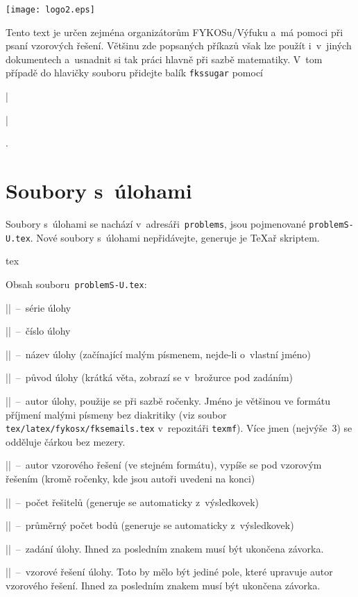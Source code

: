 \documentclass[fykos]{fksbase}
\newenvironment{texsource}
	{\VerbatimEnvironment\begin{mdframed}[backgroundcolor=mintedbg]%
		\hskip-16pt\begin{texminted}{tex}}
	{\end{texminted}\hskip-40pt\end{mdframed}}
\begin{document}
\begin{center}
	\texttt{[image: logo2.eps]}
	\hspace{10pt}
	\vskip0.6cm
\end{center}

Tento text je určen zejména organizátorům FYKOSu/Výfuku a~má pomoci při psaní
vzorových řešení. Většinu zde popsaných příkazů však lze použít i~v~jiných
dokumentech a~usnadnit si tak práci hlavně při sazbě matematiky. V~tom případě
do hlavičky souboru přidejte balík \texttt{fkssugar}
pomocí~{\texinline|\usepackage{fkssugar}|}.

\section{Soubory s~úlohami}

Soubory s~úlohami se nachází v~adresáři~\texttt{problems}, jsou pojmenované
\texttt{problemS-U.tex}. Nové soubory s~úlohami nepřidávejte, generuje je TeXař
skriptem.

\begin{texsource}
\probsolution{%
}
\end{texsource}

Obsah souboru~\texttt{problemS-U.tex}:
\begin{compactitem}
	\item \texinline|\probbatch|~--~série úlohy
	\item \texinline|\probno|~--~číslo úlohy
	\item \texinline|\probname|~--~název úlohy (začínající malým písmenem, nejde-li
		o~vlastní jméno)
	\item \texinline|\proborigin|~--~původ úlohy (krátká věta, zobrazí se v~brožurce pod
		zadáním)
	\item \texinline|\probauthors|~--~autor úlohy, použije se při sazbě ročenky. Jméno
	je většinou ve formátu příjmení malými písmeny bez diakritiky (viz soubor
	\texttt{tex/latex/fykosx/fksemails.tex} v~repozitáři \texttt{texmf}). Více jmen
	(nejvýše~3) se odděluje čárkou bez mezery.
	\item \texinline|\probsolauthors|~--~autor vzorového řešení (ve stejném formátu),
		vypíše se pod vzorovým řešením (kromě ročenky, kde jsou autoři uvedeni na konci)
	\item \texinline|\probsolvers|~--~počet řešitelů (generuje se automaticky
		z~výsledkovek)
	\item \texinline|\probavg|~--~průměrný počet bodů (generuje se automaticky
		z~výsledkovek)
	\item \texinline|\probtask|~--~zadání úlohy. Ihned za posledním znakem musí
	být ukončena závorka.
	\item \texinline|\probsolution|~--~vzorové řešení úlohy. Toto by mělo být jediné
		pole, které upravuje autor vzorového řešení. Ihned za posledním znakem musí být
		ukončena závorka.
\end{compactitem}
\end{document}
